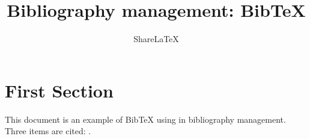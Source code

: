 \documentclass[a4paper,10pt]{article}
\title{Bibliography management: BibTeX}
\author{Share\LaTeX}
\begin{document}
\maketitle

\tableofcontents

\medskip

\section{First Section}
This document is an example of BibTeX using in bibliography management. Three items are cited: \cite{patchkovskii_2017}. 

\medskip



\end{document}
